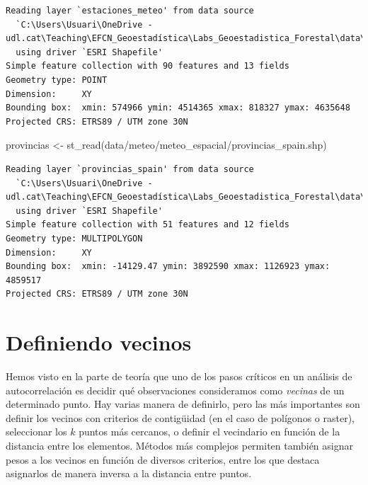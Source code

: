 \documentclass[
  letterpaper,
  DIV=11,
  numbers=noendperiod]{scrreprt}
\newenvironment{Shaded}{\begin{snugshade}}{\end{snugshade}}
\newcommand{\FunctionTok}[1]{\textcolor[rgb]{0.28,0.35,0.67}{#1}}
\newcommand{\NormalTok}[1]{\textcolor[rgb]{0.00,0.23,0.31}{#1}}
\newcommand{\OtherTok}[1]{\textcolor[rgb]{0.00,0.23,0.31}{#1}}
\newcommand{\StringTok}[1]{\textcolor[rgb]{0.13,0.47,0.30}{#1}}
\begin{document}
\begin{verbatim}
Reading layer `estaciones_meteo' from data source 
  `C:\Users\Usuari\OneDrive - udl.cat\Teaching\EFCN_Geoestadística\Labs_Geoestadistica_Forestal\data\meteo\meteo_espacial\estaciones_meteo.shp' 
  using driver `ESRI Shapefile'
Simple feature collection with 90 features and 13 fields
Geometry type: POINT
Dimension:     XY
Bounding box:  xmin: 574966 ymin: 4514365 xmax: 818327 ymax: 4635648
Projected CRS: ETRS89 / UTM zone 30N
\end{verbatim}

\begin{Shaded}
\begin{Highlighting}[]
\NormalTok{provincias }\OtherTok{\textless{}{-}} \FunctionTok{st\_read}\NormalTok{(}\StringTok{\textquotesingle{}data/meteo/meteo\_espacial/provincias\_spain.shp\textquotesingle{}}\NormalTok{)}
\end{Highlighting}
\end{Shaded}

\begin{verbatim}
Reading layer `provincias_spain' from data source 
  `C:\Users\Usuari\OneDrive - udl.cat\Teaching\EFCN_Geoestadística\Labs_Geoestadistica_Forestal\data\meteo\meteo_espacial\provincias_spain.shp' 
  using driver `ESRI Shapefile'
Simple feature collection with 51 features and 12 fields
Geometry type: MULTIPOLYGON
Dimension:     XY
Bounding box:  xmin: -14129.47 ymin: 3892590 xmax: 1126923 ymax: 4859517
Projected CRS: ETRS89 / UTM zone 30N
\end{verbatim}

\hypertarget{definiendo-vecinos}{%
\section{Definiendo vecinos}\label{definiendo-vecinos}}

Hemos visto en la parte de teoría que uno de los pasos críticos en un
análisis de autocorrelación es decidir qué observaciones consideramos
como \emph{vecinas} de un determinado punto. Hay varias manera de
definirlo, pero las más importantes son definir los vecinos con
criterios de contigüidad (en el caso de polígonos o raster), seleccionar
los \(k\) puntos más cercanos, o definir el vecindario en función de la
distancia entre los elementos. Métodos más complejos permiten también
asignar pesos a los vecinos en función de diversos criterios, entre los
que destaca asignarlos de manera inversa a la distancia entre puntos.
\end{document}
